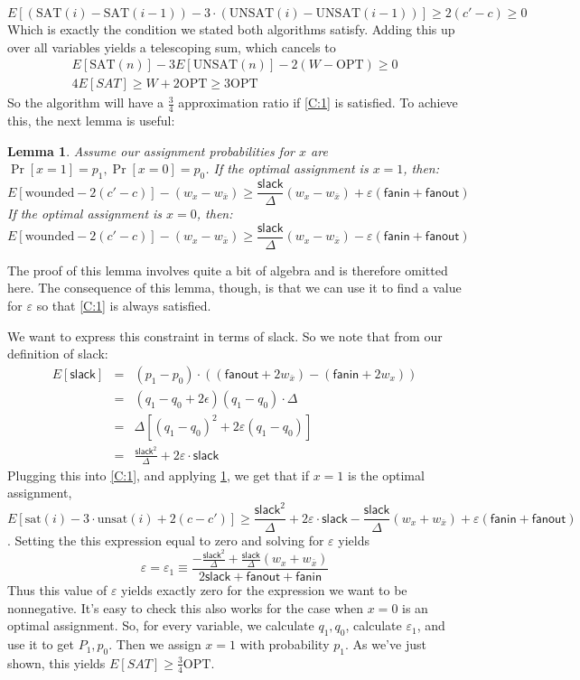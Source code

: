 \documentclass[11pt,letter]{article}
\newtheorem{lemma}{Lemma}
\begin{document}
\begin{equation}
E[(\mathrm{SAT}(i) - \mathrm{SAT}(i-1)) - 3\cdot(\mathrm{UNSAT}(i) - \mathrm{UNSAT}(i-1))] \ge  2(c'-c) \ge 0
\end{equation}
Which is exactly the condition we stated both algorithms satisfy. Adding this up over all variables yields a telescoping sum, which cancels to
\begin{eqnarray}
E[\mathrm{SAT}(n)] - 3E[\mathrm{UNSAT}(n)] - 2(W-\mathrm{OPT}) \ge 0
\\4E[SAT] \ge W + 2\mathrm{OPT} \ge 3\mathrm{OPT}
\end{eqnarray}
So the algorithm will have a $\frac{3}{4}$ approximation ratio if \ref{C:1} is satisfied. To achieve this, the next lemma is useful:
\begin{lemma} \label{L:3}
Assume our assignment probabilities for $x$ are $\Pr[x = 1] = p_1, \Pr[x=0] = p_0$. If the optimal assignment is $x=1$, then:
\[E[\mathrm{wounded} - 2(c'-c)] - (w_x - w_{\bar{x}}) \ge \frac{\mathsf{slack}}{\Delta}(w_x - w_{\bar{x}}) + \varepsilon(\mathsf{fanin} + \mathsf{fanout})\]
If the optimal assignment is  $x=0$, then:
\[E[\mathrm{wounded} - 2(c'-c)] - (w_x - w_{\bar{x}}) \ge \frac{\mathsf{slack}}{\Delta}(w_x - w_{\bar{x}}) - \varepsilon(\mathsf{fanin} + \mathsf{fanout})\]
\end{lemma}
The proof of this lemma involves quite a bit of algebra and is therefore omitted here. The consequence of this lemma, though, is that we can use it to find a value for $\varepsilon$ so that  \ref{C:1} is always satisfied.

We want to express this constraint in terms of slack. So we note that from our definition of slack:
\begin{eqnarray}
E[\mathsf{slack}] &=& (p_1-p_0)\cdot ((\mathsf{fanout} + 2w_{\bar{x}}) -(\mathsf{fanin} + 2w_x))
\\&=& (q_1-q_0+2\epsilon)(q_1-q_0)\cdot\Delta
\\&=& \Delta[(q_1-q_0)^2 + 2\varepsilon(q_1-q_0)]
\\&=& \frac{\mathsf{slack}^2}{\Delta} +2\varepsilon\cdot\mathsf{slack}
\end{eqnarray}
Plugging this into \ref{C:1}, and applying \ref{L:3}, we get that if $x=1$ is the optimal assignment,
\[E[\mathrm{sat}(i) - 3\cdot\mathrm{unsat}(i)+ 2(c-c')] \ge \frac{\mathsf{slack}^2}{\Delta} +2\varepsilon\cdot\mathsf{slack} - \frac{\mathsf{slack}}{\Delta}(w_x + w_{\bar{x}}) + \varepsilon(\mathsf{fanin} + \mathsf{fanout})\].
Setting the this expression equal to zero and solving for $\varepsilon$ yields
\begin{equation}
\varepsilon = \varepsilon_1 \equiv \frac{-\frac{\mathsf{slack}^2}{\Delta} + \frac{\mathsf{slack}}{\Delta}(w_x + w_{\bar{x}})}{2\mathsf{slack}+ \mathsf{fanout} + \mathsf{fanin}}
\end{equation}
Thus this value of $\varepsilon$ yields exactly zero for the expression we want to be nonnegative. It's easy to check this also works for the case when $x=0$ is an optimal assignment. So, for every variable, we calculate $q_1, q_0$, calculate $\varepsilon_1$, and use it to get $P_1, p_0$. Then we assign $x=1$ with probability $p_1$. As we've just shown, this yields $E[SAT] \ge \frac{3}{4}\mathrm{OPT}$.
\end{document}
